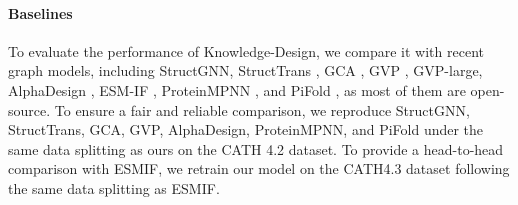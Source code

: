 \documentclass{article}
\begin{document}
\paragraph{Baselines} To evaluate the performance of Knowledge-Design, we compare it with recent graph models, including StructGNN, StructTrans \citep{ingraham2019generative}, GCA \citep{tan2022generative}, GVP \citep{jing2020learning}, GVP-large, AlphaDesign \citep{gao2022alphadesign}, ESM-IF \citep{hsu2022learning}, ProteinMPNN \citep{dauparas2022robust}, and PiFold \citep{gao2023pifold}, as most of them are open-source. To ensure a fair and reliable comparison, we reproduce StructGNN, StructTrans, GCA, GVP, AlphaDesign, ProteinMPNN, and PiFold under the same data splitting as ours on the CATH 4.2 dataset. To provide a head-to-head comparison with ESMIF, we retrain our model on the CATH4.3 dataset following the same data splitting as ESMIF. 
\end{document}
